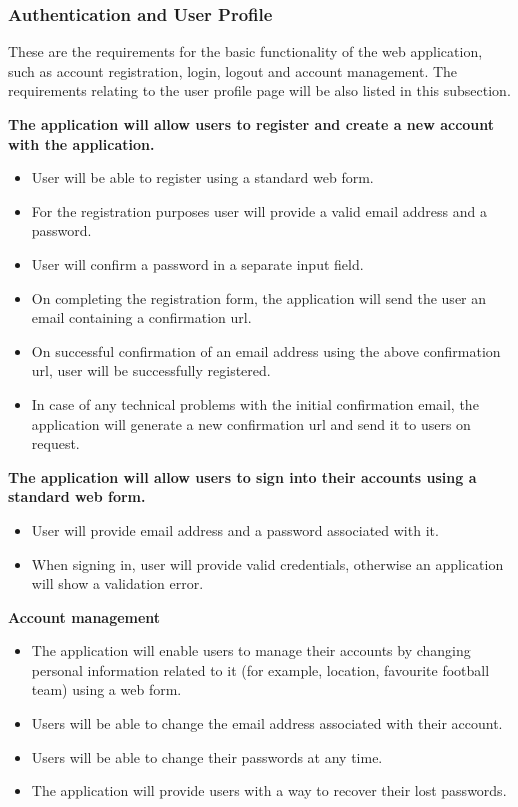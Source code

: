 \subsubsection{Authentication and User Profile}
\label{sec:authandprofile_req}
These are the requirements for the basic functionality of the web application, such as account registration, login, logout and account management. The requirements relating to the user profile page will be also listed in this subsection.

\textbf{The application will allow users to register and create a new account with the application.}
\begin{itemize}
 	\item User will be able to register using a standard web form.
 	\item For the registration purposes user will provide a valid email address and a password.
 	\item User will confirm a password in a separate input field.
 	\item On completing the registration form, the application will send the user an email containing a confirmation url.
 	\item On successful confirmation of an email address using the above confirmation url, user will be successfully registered.
 	\item In case of any technical problems with the initial confirmation email, the application will generate a new confirmation url and send it to users on request.
\end{itemize}

\textbf{The application will allow users to sign into their accounts using a standard web form.}
\begin{itemize}
	\item User will provide email address and a password associated with it.
	\item When signing in, user will provide valid credentials, otherwise an application will show a validation error.
\end{itemize}

\textbf{Account management}
\begin{itemize}
	\item The application will enable users to manage their accounts by changing personal information related to it (for example, location, favourite football team) using a web form.
	\item Users will be able to change the email address associated with their account.
	\item Users will be able to change their passwords at any time. 
	\item The application will provide users with a way to recover their lost passwords.
\end{itemize}

